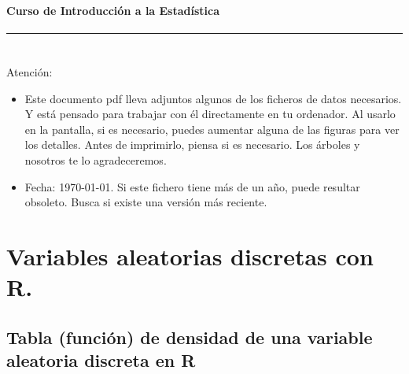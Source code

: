 \documentclass[10pt,a4paper]{article}\usepackage[]{graphicx}\usepackage[]{color}
\newcounter {cont01}
\begin{document}




\paragraph{\hspace{6.3cm}Curso de Introducción a la Estadística\\[2mm]} \noindent\hrule

\setcounter{section}{0}
\section*{\hspace{-0.1cm}}
{
Atención:
\begin{itemize}
  \item Este documento pdf lleva adjuntos algunos de los ficheros de datos necesarios. Y está pensado para trabajar con él directamente en tu ordenador. Al usarlo en la pantalla, si es necesario, puedes aumentar alguna de las figuras para ver los detalles. Antes de imprimirlo, piensa si es necesario. Los árboles y nosotros te lo agradeceremos.
  \item Fecha: \today. Si este fichero tiene más de un año, puede resultar obsoleto. Busca si existe una versión más reciente.
\end{itemize}
}
\setcounter{tocdepth}{1}
\tableofcontents

\section{Variables aleatorias discretas con R.}
\label{tut04:sec:VariablesAleatoriasDiscretas}

\subsection{Tabla (función) de densidad de una variable aleatoria discreta en R}
\label{tut04:subsec:TablaDensidadVariableAleatoriaDiscretaEnR}
\end{document}

